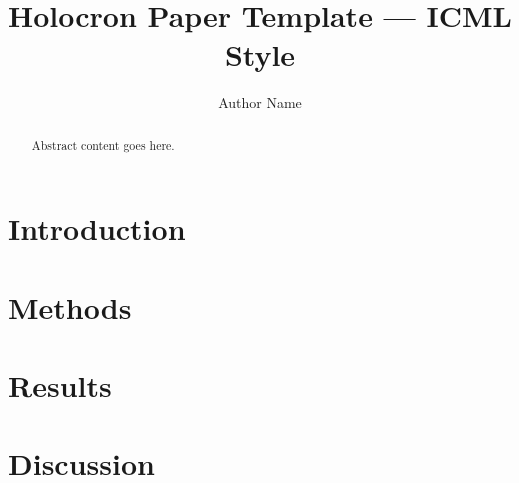 \documentclass{article}
\title{Holocron Paper Template — ICML Style}
\author{Author Name}
\begin{document}
\maketitle
\begin{abstract}
Abstract content goes here.
\end{abstract}
\section{Introduction}
\section{Methods}
\section{Results}
\section{Discussion}


\end{document}
